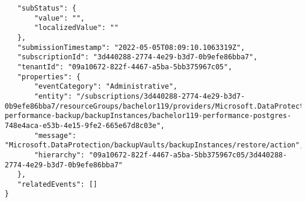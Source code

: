 \begin{verbatim}
   "subStatus": {
       "value": "",
       "localizedValue": ""
   },
   "submissionTimestamp": "2022-05-05T08:09:10.1063319Z",
   "subscriptionId": "3d440288-2774-4e29-b3d7-0b9efe86bba7",
   "tenantId": "09a10672-822f-4467-a5ba-5bb375967c05",
   "properties": {
       "eventCategory": "Administrative",
       "entity": "/subscriptions/3d440288-2774-4e29-b3d7-0b9efe86bba7/resourceGroups/bachelor119/providers/Microsoft.DataProtection/backupVaults/bachelor119-performance-backup/backupInstances/bachelor119-performance-postgres-748e4aca-e53b-4e15-9fe2-665e67d8c03e",
       "message": "Microsoft.DataProtection/backupVaults/backupInstances/restore/action",
       "hierarchy": "09a10672-822f-4467-a5ba-5bb375967c05/3d440288-2774-4e29-b3d7-0b9efe86bba7"
   },
   "relatedEvents": []
}
\end{verbatim}